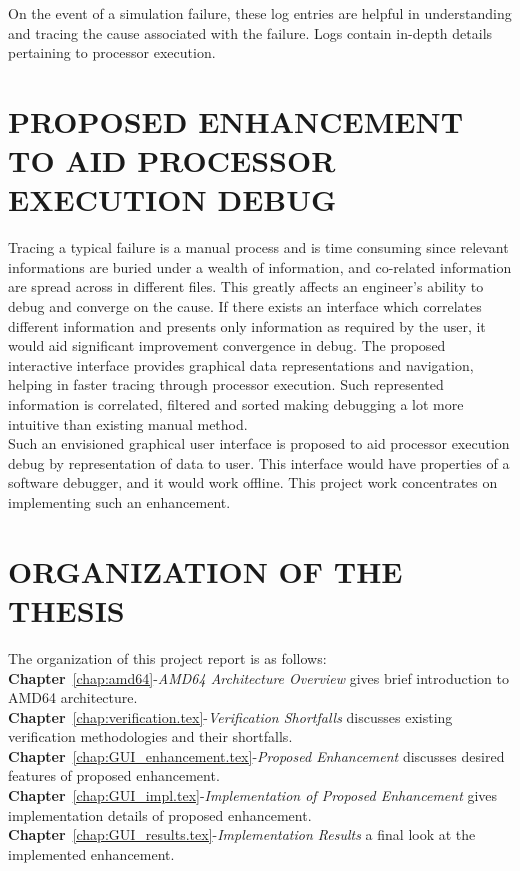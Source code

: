 On the event of a simulation failure, these log entries are helpful in understanding and tracing the cause associated with the failure. Logs contain in-depth details pertaining to processor execution. 

\section{PROPOSED ENHANCEMENT TO AID PROCESSOR EXECUTION DEBUG}
Tracing a typical failure is a manual process and is time consuming since relevant informations are buried under a wealth of information, and co-related information are spread across in different files. This greatly affects an engineer's ability to debug and converge on the cause. If there exists an interface which correlates different information and presents only information as required by the user, it would aid significant improvement convergence in debug. The proposed interactive interface provides graphical data representations and navigation, helping in faster tracing through processor execution. Such represented information is correlated, filtered and sorted making debugging a lot more intuitive than existing manual method.\\
Such an envisioned graphical user interface is proposed to aid processor execution debug by representation of data to user. This interface would have properties of a software debugger, and it would work offline. This project work concentrates on implementing such an enhancement.

 


\section{ORGANIZATION OF THE THESIS}
The organization of this project report is as follows:\\
\noindent 
{\bf Chapter}~\ref{chap:amd64}-{\it AMD64 Architecture Overview} gives brief introduction to AMD64 architecture.\\
{\bf Chapter}~\ref{chap:verification.tex}-{\it Verification Shortfalls} discusses existing verification methodologies and their shortfalls.\\
{\bf Chapter}~\ref{chap:GUI_enhancement.tex}-{\it Proposed Enhancement} discusses desired features of proposed enhancement.\\
{\bf Chapter}~\ref{chap:GUI_impl.tex}-{\it Implementation of Proposed Enhancement} gives implementation details of proposed enhancement.\\
{\bf Chapter}~\ref{chap:GUI_results.tex}-{\it Implementation Results} a final look at the implemented enhancement.\\

